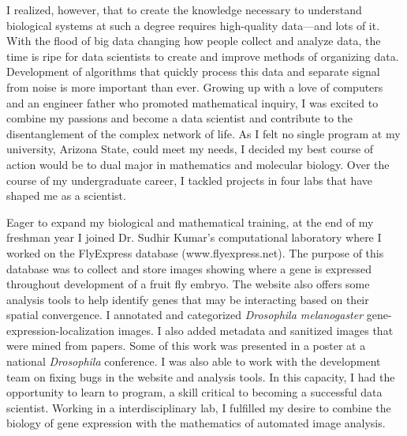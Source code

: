 \documentclass[12pt]{article}
\begin{document}
I realized, however, that to create the knowledge necessary to understand biological systems at such a degree requires high-quality data---and lots of it. With the flood of big data changing how people collect and analyze data, the time is ripe for data scientists to create and improve methods of organizing data. Development of algorithms that quickly process this data and separate signal from noise is more important than ever. Growing up with a love of computers and an engineer father who promoted mathematical inquiry, I was excited to combine my passions and become a data scientist and contribute to the disentanglement of the complex network of life. As I felt no single program at my university, Arizona State, could meet my needs, I decided my best course of action would be to dual major in mathematics and molecular biology. Over the course of my undergraduate career, I tackled projects in four labs that have shaped me as a scientist.

Eager to expand my biological and mathematical training, at the end of my freshman year I joined Dr. Sudhir Kumar's computational laboratory where I worked on the FlyExpress database (www.flyexpress.net). The purpose of this database was to collect and store images showing where a gene is expressed throughout development of a fruit fly embryo. The website also offers some analysis tools to help identify genes that may be interacting based on their spatial convergence.
I annotated and categorized \textit{Drosophila melanogaster} gene-expression-localization images. I also added metadata and sanitized images that were mined from papers. Some of this work was presented in a poster at a national \textit{Drosophila} conference. I was also able to work with the development team on fixing bugs in the website and analysis tools. In this capacity, I had the opportunity to learn to program, a skill critical to becoming a successful data scientist. Working in a interdisciplinary lab, I fulfilled my desire to combine the biology of gene expression with the mathematics of automated image analysis.
\end{document}

